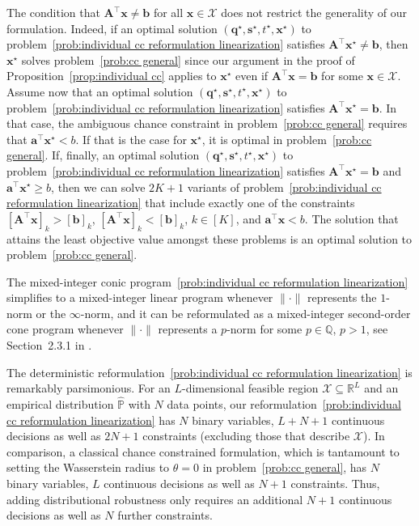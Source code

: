 \documentclass[nonblindrev]{informs2017}
\newcommand{\1}[1]{\mathds{1}{\left(#1\right)}}
\begin{document}
\begin{remark}
The condition that $\bm{A}^\top\bm{x} \ne \bm{b}$ for all $\bm{x} \in \mathcal{X}$ does not restrict the generality of our formulation. Indeed, if an optimal solution $(\bm{q}^\star, \bm{s}^\star, t^\star, \bm{x}^\star)$ to problem~\eqref{prob:individual cc reformulation linearization} satisfies $\bm{A}^\top\bm{x}^\star \ne \bm{b}$, then $\bm{x}^\star$ solves problem~\eqref{prob:cc general} since our argument in the proof of Proposition~\ref{prop:individual cc} applies to $\bm{x}^\star$ even if $\bm{A}^\top\bm{x} = \bm{b}$ for some $\bm{x} \in \mathcal{X}$. Assume now that an optimal solution $(\bm{q}^\star, \bm{s}^\star, t^\star, \bm{x}^\star)$ to problem~\eqref{prob:individual cc reformulation linearization} satisfies $\bm{A}^\top\bm{x}^\star = \bm{b}$. In that case, the ambiguous chance constraint in problem~\eqref{prob:cc general} requires that $\bm{a}^\top \bm{x}^\star < b$. If that is the case for $\bm{x}^\star$, it is optimal in problem~\eqref{prob:cc general}. If, finally, an optimal solution $(\bm{q}^\star, \bm{s}^\star, t^\star, \bm{x}^\star)$ to problem~\eqref{prob:individual cc reformulation linearization} satisfies $\bm{A}^\top\bm{x}^\star = \bm{b}$ and $\bm{a}^\top \bm{x}^\star \geq b$, then we can solve $2 K + 1$ variants of problem~\eqref{prob:individual cc reformulation linearization} that include exactly one of the constraints $[\bm{A}^\top\bm{x}]_k > [\bm{b}]_k$, $[\bm{A}^\top\bm{x}]_k < [\bm{b}]_k$, $k \in [K]$, and $\bm{a}^\top \bm{x} < b$. The solution that attains the least objective value amongst these problems is an optimal solution to problem~\eqref{prob:cc general}.
\end{remark}

\begin{remark}
The mixed-integer conic program~\eqref{prob:individual cc reformulation linearization} simplifies to a mixed-integer linear program whenever $\|\cdot\|$ represents the $1$-norm or the $\infty$-norm, and it can be reformulated as a mixed-integer second-order cone program whenever $\|\cdot\|$ represents a $p$-norm for some $p \in \mathbb{Q}$, $p>1$, see Section~2.3.1 in \cite{Ben-tal_Nemirovski_book}.
\end{remark}

\begin{remark}
The deterministic reformulation~\eqref{prob:individual cc reformulation linearization} is remarkably parsimonious. For an $L$-dimensional feasible region $\mathcal{X} \subseteq \mathbb{R}^L$ and an empirical distribution $\hat{\mathbb{P}}$ with $N$ data points, our reformulation~\eqref{prob:individual cc reformulation linearization} has $N$ binary variables, $L + N + 1$ continuous decisions as well as $2N + 1$ constraints (excluding those that describe $\mathcal{X}$). In comparison, a classical chance constrained formulation, which is tantamount to setting the Wasserstein radius to $\theta = 0$ in problem~\eqref{prob:cc general}, has $N$ binary variables, $L$ continuous decisions as well as $N + 1$ constraints. Thus, adding distributional robustness only requires an additional $N + 1$ continuous decisions as well as $N$ further constraints.
\end{remark}
\end{document}
